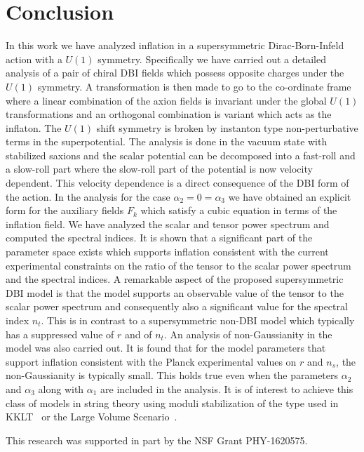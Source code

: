 \documentclass[a4paper,11pt]{article}
\begin{document}
\section{Conclusion\label{sec7}}
	In this work we have analyzed inflation in a supersymmetric Dirac-Born-Infeld action with a $U(1)$ symmetry.
	Specifically we have carried out a detailed analysis of a pair of chiral DBI fields which possess opposite charges
	under the $U(1)$ symmetry. A transformation is then made to go to the co-ordinate frame where a linear
	combination of the axion fields is invariant under the global $U(1)$ transformations and an orthogonal combination
	is variant which acts as the inflaton. The $U(1)$ shift symmetry is broken by instanton type non-perturbative terms
	in the superpotential. The analysis is done
	in the vacuum state with stabilized saxions and the scalar potential can be decomposed into a fast-roll and a slow-roll
	part where the slow-roll part of the potential is now velocity dependent. This velocity dependence is a direct consequence of the
	DBI form of the action. In the analysis for the case $\alpha_2=0=\alpha_3$
	 we have obtained an explicit form for the auxiliary fields $F_k$ which satisfy a cubic equation
	in terms of the inflation field. We have analyzed the scalar and tensor power spectrum and computed the spectral indices.
	It is shown that a significant part of the parameter space exists which supports inflation consistent with the current experimental
	constraints on the ratio of the tensor to the scalar power spectrum and the spectral indices. A remarkable aspect of the
	proposed supersymmetric DBI model is that the model supports an observable value of the tensor to the scalar power spectrum
	and consequently also a significant value for the spectral index $n_t$. This is in contrast to a supersymmetric non-DBI model
	which typically has a suppressed value of $r$ and of $n_t$. An analysis of non-Gaussianity in the model was also carried out.
	It is found that for the model parameters that support inflation consistent with the Planck experimental values on $r$ and
	$n_s$, the non-Gaussianity is typically small. This holds true even when the parameters $\alpha_2$ and $\alpha_3$ along with
	$\alpha_1$ are included in the analysis.
		It is of interest to achieve this class of models in string theory using
	moduli stabilization of the type used in KKLT~\cite{Kachru:2003aw}
	or the Large Volume Scenario~\cite{Balasubramanian:2005zx}.

\acknowledgments
	This research was supported in part by the NSF Grant PHY-1620575.
\end{document}
